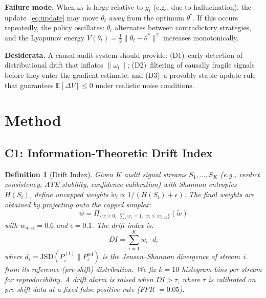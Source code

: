\documentclass{article}
\newtheorem{definition}{Definition}
\begin{document}
\textbf{Failure mode.} When $\omega_t$ is large relative to $g_t$
(e.g., due to hallucination), the update~\eqref{eq:update} may move
$\theta_t$ \emph{away} from the optimum $\theta^*$. If this occurs
repeatedly, the policy oscillates: $\theta_t$ alternates between
contradictory strategies, and the Lyapunov energy
$V(\theta_t) = \tfrac{1}{2}\|\theta_t - \theta^*\|^2$ increases
monotonically.

\textbf{Desiderata.} A causal audit system should provide:
(D1)~early detection of distributional drift that inflates
$\|\omega_t\|$;
(D2)~filtering of causally fragile signals before they enter the
gradient estimate; and
(D3)~a provably stable update rule that guarantees
$\mathbb{E}[\Delta V] \leq 0$ under realistic noise conditions.


\section{Method}
\label{sec:method}


\subsection{C1: Information-Theoretic Drift Index}
\label{sec:drift}

\begin{definition}[Drift Index]
\label{def:drift}
Given $K$ audit signal streams $S_1, \ldots, S_K$ (e.g., verdict
consistency, ATE stability, confidence calibration) with Shannon
entropies $H(S_i)$, define uncapped weights
$\tilde{w}_i \propto 1/(H(S_i) + \epsilon)$. The final weights are
obtained by projecting onto the capped simplex:
\begin{equation}
  w = \Pi_{\{w \geq 0,\; \sum_i w_i = 1,\; w_i \leq w_{\max}\}}(\tilde{w})
  \label{eq:cap}
\end{equation}
with $w_{\max} = 0.6$ and $\epsilon = 0.1$. The drift index is:
\begin{equation}
  DI = \sum_{i=1}^{K} w_i \cdot d_i
  \label{eq:drift}
\end{equation}
where $d_i = \text{JSD}(P_i^{(t)} \| P_i^{\text{ref}})$ is the
Jensen--Shannon divergence of stream~$i$ from its reference
(pre-shift) distribution.
We fix $k{=}10$ histogram bins per stream for reproducibility.
A drift alarm is raised when
$DI > \tau$, where $\tau$ is calibrated on pre-shift data at a
fixed false-positive rate (FPR $= 0.05$).
\end{definition}
\end{document}
